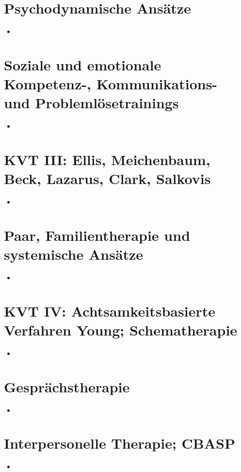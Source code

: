 \documentclass[11pt, paper=a4, twocolumn]{scrartcl}
\begin{document}
	\section{Psychodynamische Ansätze}
		\begin{itemize}
			\item 
		\end{itemize}

	\section{Soziale und emotionale Kompetenz-, Kommunikations- und Problemlösetrainings}
		\begin{itemize}
			\item 
		\end{itemize}

	\section{KVT III: Ellis, Meichenbaum, Beck, Lazarus, Clark, Salkovis}
		\begin{itemize}
			\item 
		\end{itemize}

	\section{Paar, Familientherapie und systemische Ansätze}
		\begin{itemize}
			\item 
		\end{itemize}

	\section{KVT IV: Achtsamkeitsbasierte Verfahren Young; Schematherapie}
		\begin{itemize}
			\item 
		\end{itemize}

	\section{Gesprächstherapie}
		\begin{itemize}
			\item 
		\end{itemize}

	\section{Interpersonelle Therapie; CBASP}
		\begin{itemize}
			\item 
		\end{itemize}
\end{document}
